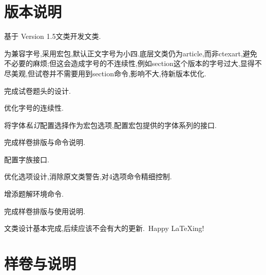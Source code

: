 \documentclass[list,answers,csize4,custom]{sysuexam}
\begin{document}
\section{版本说明}
\small{
\par
\begin{compactitem}
    \item 基于\href{https://github.com/mathedu4all/bhcexam}{} Version 1.5文类开发文类.
    \item 为兼容字号,采用\CTeX{}宏包,默认正文字号为小四.底层文类仍为article,而非ctexart,避免不必要的麻烦;但这会造成字号的不连续性,例如section这个版本的字号过大,显得不尽美观,但试卷并不需要用到section命令,影响不大,待新版本优化.
    \item 完成试卷题头的设计.
\end{compactitem}

\todo\par
\begin{compactitem}
    \item 优化字号的连续性.
    \item 将字体\textit{私订}配置选择作为宏包选项,配置\CTeX{}宏包提供的字体系列的接口.
    \item 完成样卷排版与命令说明.
\end{compactitem}

\par
\begin{compactitem}
    \item 配置字族接口.
    \item 优化选项设计,消除原文类警告,对4选项命令精细控制.
    \item 增添题解环境命令.
    \item 完成样卷排版与使用说明.
\end{compactitem}
\medskip

文类设计基本完成,后续应该不会有大的更新.~Happy \LaTeX{}ing!
}

\section{样卷与说明}

\end{document}
